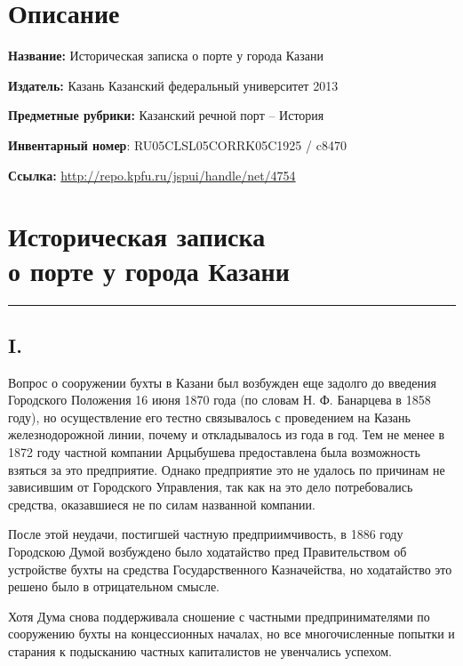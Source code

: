 \documentclass[oneside,final,14pt]{extreport}
\begin{document}
\section*{Описание}

{\bf Название:} Историческая записка о порте у города Казани

{\bf Издатель:} Казань Казанский федеральный университет 2013

{\bf Предметные рубрики:} Казанский речной порт -- История

{\bf Инвентарный номер}: RU05CLSL05CORRK05C1925 / c8470

{\bf Ссылка:} \hyperref[http://repo.kpfu.ru/jspui/handle/net/4754]{http://repo.kpfu.ru/jspui/handle/net/4754}

{%
	\centering
\section*{Историческая записка \\о порте у города Казани}
}

\begin{center}
	\noindent\rule{8cm}{0.4pt}
\end{center}

{%
	\centering
	\subsection*{I.}
}

Вопрос о сооружении бухты в Казани был возбужден еще задолго до введения Городского Положения 16 июня 1870 года (по словам Н. Ф. Банарцева в 1858 году), но осуществление его тестно связывалось с проведением на Казань железнодорожной линии, почему и откладывалось из года в год. Тем не менее в 1872 году частной компании Арцыбушева предоставлена была возможность взяться за это предприятие. Однако предприятие это не удалось по причинам не зависившим от Городского Управления, так как на это дело потребовались средства, оказавшиеся не по силам названной компании.

После этой неудачи, постигшей частную предприимчивость, в 1886 году Городскою Думой возбуждено было ходатайство пред Правительством об устройстве бухты на средства Государственного Казначейства, но ходатайство это решено было в отрицательном смысле.

Хотя Дума снова поддерживала сношение с частными предпринимателями по сооружению бухты на концессионных началах, но все многочисленные попытки и старания к подысканию частных капиталистов не увенчались успехом.
\end{document}
